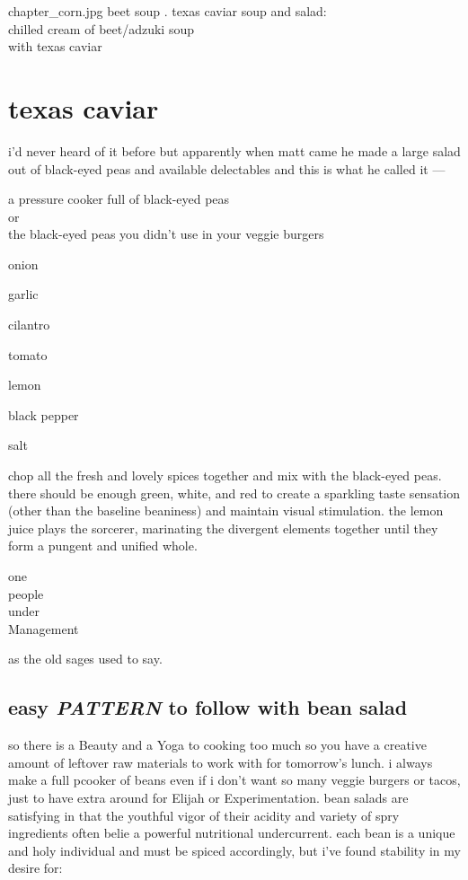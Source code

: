 \mychapter
{chapter_corn.jpg}
{beet soup . texas caviar}
{soup and salad:\\
chilled cream of beet/adzuki soup\\
with texas caviar}

\section{texas caviar}

i'd never heard of it before but apparently when matt came he made a
large salad out of black-eyed peas and available delectables and this
is what he called it ---

\begin{ingredients}
  \item a pressure cooker full of black-eyed peas\\
  \textrm{or}\\
  the black-eyed peas you didn't use in your veggie burgers
  \item onion
  \item garlic
  \item cilantro
  \item tomato
  \item lemon
  \item black pepper
  \item salt
\end{ingredients}

chop all the fresh and lovely spices together and mix with the
black-eyed peas. there should be enough green, white, and red to
create a sparkling taste sensation (other than the baseline beaniness)
and maintain visual stimulation. the lemon juice plays the sorcerer,
marinating the divergent elements together until they form a pungent
and unified whole.

\noindent
one\\
people\\
under\\
Management

as the old sages used to say.

\subsection{easy \textit{PATTERN} to follow with bean salad}

so there is a Beauty and a Yoga to cooking too much so you have a
creative amount of leftover raw materials to work with for tomorrow's
lunch. i always make a full pcooker of beans even if i don't want so
many veggie burgers or tacos, just to have extra around for Elijah or
Experimentation. bean salads are satisfying in that the youthful vigor
of their acidity and variety of spry ingredients often belie a
powerful nutritional undercurrent. each bean is a unique and holy
individual and must be spiced accordingly, but i've found stability in
my desire for:

